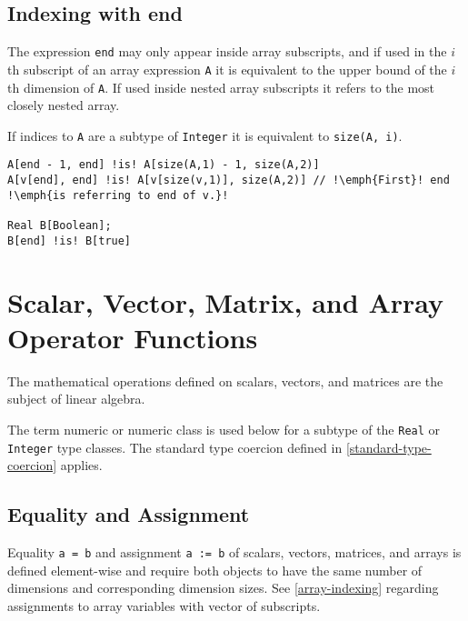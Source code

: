 \subsection{Indexing with end}\label{indexing-with-end}

The expression \lstinline!end! may only appear inside array subscripts, and if used in the $i$th subscript of an array expression \lstinline!A! it is equivalent to the upper bound of the $i$th dimension of \lstinline!A!.
If used inside nested array subscripts it refers to the most closely nested array.

\begin{nonnormative}
If indices to \lstinline!A! are a subtype of \lstinline!Integer! it is equivalent to \lstinline!size(A, i)!.
\end{nonnormative}

\begin{example}
\begin{lstlisting}[language=modelica, escapechar=!]
A[end - 1, end] !is! A[size(A,1) - 1, size(A,2)]
A[v[end], end] !is! A[v[size(v,1)], size(A,2)] // !\emph{First}! end !\emph{is referring to end of v.}!

Real B[Boolean];
B[end] !is! B[true]
\end{lstlisting}
\end{example}

\section{Scalar, Vector, Matrix, and Array Operator Functions}\label{scalar-vector-matrix-and-array-operator-functions}

The mathematical operations defined on scalars, vectors, and matrices are the subject of linear algebra.

The term numeric or numeric class is used below for a subtype of the \lstinline!Real! or \lstinline!Integer! type classes.  The standard type coercion defined
in \cref{standard-type-coercion} applies.

\subsection{Equality and Assignment}\label{equality-and-assignment}

Equality \lstinline!a = b! and assignment \lstinline!a := b! of scalars, vectors, matrices, and arrays is defined element-wise and require both objects to have the same number of dimensions and corresponding dimension sizes.
See \cref{array-indexing} regarding assignments to array variables with vector of subscripts.

